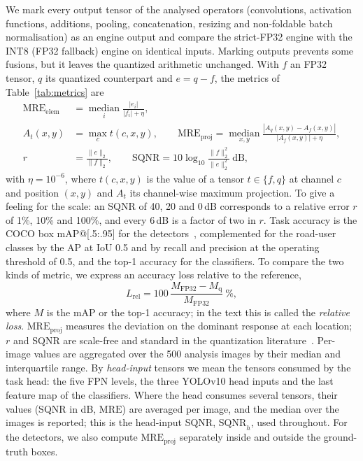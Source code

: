 \documentclass[pdflatex,sn-mathphys-num]{sn-jnl}%
\theoremstyle{thmstyleone}%
\theoremstyle{thmstyletwo}%
\theoremstyle{thmstylethree}%
\begin{document}
We mark every output tensor of the analysed operators (convolutions, activation functions, additions, pooling, concatenation, resizing and non-foldable batch normalisation) as an engine output and compare the strict-FP32 engine with the INT8 (FP32 fallback) engine on identical inputs. Marking outputs prevents some fusions, but it leaves the quantized arithmetic unchanged. With $f$ an FP32 tensor, $q$ its quantized counterpart and $e=q-f$, the metrics of Table~\ref{tab:metrics} are
\begin{align}
\mathrm{MRE}_\mathrm{elem} &= \operatorname*{median}_{i}\frac{|e_i|}{|f_i|+\eta}, \label{eq:mre}\\
A_t(x,y) &= \max_{c} t(c,x,y), \qquad
\mathrm{MRE}_\mathrm{proj} = \operatorname*{median}_{x,y}\frac{|A_q(x,y)-A_f(x,y)|}{|A_f(x,y)|+\eta}, \label{eq:proj}\\
r &= \frac{\lVert e\rVert_2}{\lVert f\rVert_2}, \qquad \mathrm{SQNR} = 10\log_{10}\frac{\lVert f\rVert_2^2}{\lVert e\rVert_2^2}\ \mathrm{dB}, \label{eq:sqnr}
\end{align}
with $\eta=10^{-6}$, where $t(c,x,y)$ is the value of a tensor $t\in\{f,q\}$ at channel $c$ and position $(x,y)$ and $A_t$ its channel-wise maximum projection. To give a feeling for the scale: an SQNR of 40, 20 and 0\,dB corresponds to a relative error $r$ of 1\%, 10\% and 100\%, and every 6\,dB is a factor of two in $r$. Task accuracy is the COCO box mAP@[.5:.95] for the detectors~\cite{lin2014microsoft,padilla2021metrics}, complemented for the road-user classes by the AP at IoU 0.5 and by recall and precision at the operating threshold of 0.5, and the top-1 accuracy for the classifiers. To compare the two kinds of metric, we express an accuracy loss relative to the reference,\begin{equation}L_\mathrm{rel}=100\,\frac{M_\mathrm{FP32}-M_\mathrm{q}}{M_\mathrm{FP32}}\ \%,\label{eq:relloss}\end{equation}where $M$ is the mAP or the top-1 accuracy; in the text this is called the \emph{relative loss}. $\mathrm{MRE}_\mathrm{proj}$ measures the deviation on the dominant response at each location; $r$ and SQNR are scale-free and standard in the quantization literature~\cite{nagel2021whitepaper}. Per-image values are aggregated over the 500 analysis images by their median and interquartile range. By \emph{head-input} tensors we mean the tensors consumed by the task head: the five FPN levels, the three YOLOv10 head inputs and the last feature map of the classifiers. Where the head consumes several tensors, their values (SQNR in dB, $\mathrm{MRE}$) are averaged per image, and the median over the images is reported; this is the head-input SQNR, $\mathrm{SQNR}_h$, used throughout. For the detectors, we also compute $\mathrm{MRE}_\mathrm{proj}$ separately inside and outside the ground-truth boxes.
\end{document}
